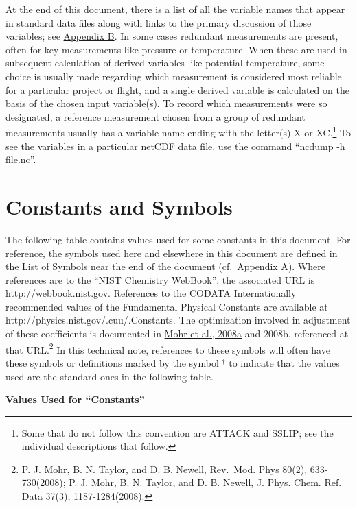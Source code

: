 \documentclass[
  english,
]{book}
\begin{document}
At the end of this document, there is a list of all the variable names that appear in standard data files along with links to the primary discussion of those variables; see \href{/rmd_output/1/appendix-b-variable-names.html\#variable-names}{Appendix B}. In some cases redundant measurements are present, often for key measurements like pressure or temperature. When these are used in subsequent calculation of derived variables like potential temperature, some choice is usually made regarding which measurement is considered most reliable for a particular project or flight, and a single derived variable is calculated on the basis of the chosen input variable(s). To record which measurements were so designated, a reference measurement chosen from a group of redundant measurements usually has a variable name ending with the letter(s) X or XC.\footnote{Some that do not follow this convention are ATTACK and SSLIP; see the individual descriptions that follow.}
To see the variables in a particular netCDF data file, use the command ``ncdump -h file.nc''.

\hypertarget{constants-and-symbols}{%
\section{Constants and Symbols}\label{constants-and-symbols}}

The following table contains values used for some constants in this document. For reference, the symbols used here and elsewhere in this document are defined in the List of Symbols near the end of the document (cf.~\href{/rmd_output/1/appendix-a-list-of-symbols.html\#list-of-symbols}{Appendix A}). Where references are to the ``NIST Chemistry WebBook'', the associated URL is http://webbook.nist.gov. References to the CODATA Internationally recommended values of the Fundamental Physical Constants are available at http://physics.nist.gov/.cuu/.Constants. The optimization involved in adjustment of these coefficients is documented in \href{https://physics.nist.gov/cuu/pdf/RevModPhys_80_000633acc.pdf}{Mohr et al., 2008a} and 2008b, referenced at that URL.\footnote{P. J. Mohr, B. N. Taylor, and D. B. Newell, Rev.~Mod. Phys 80(2), 633-730(2008); P. J. Mohr, B. N. Taylor, and D. B. Newell, J. Phys. Chem. Ref. Data 37(3), 1187-1284(2008).}
In this technical note, references to these symbols will often have these symbols or definitions marked by the symbol \(^\dagger\) to indicate that the values used are the standard ones in the following table.

\textbf{\protect\hypertarget{constants-table}{}{Values Used for ``Constants''}}
\end{document}
